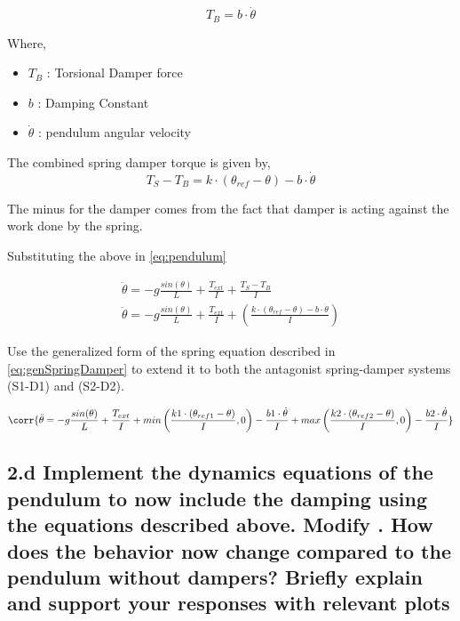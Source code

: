 \documentclass{cmc}
\begin{document}
\begin{equation}
  \label{eqn:damper}
  T_{B} = b \cdot \dot{\theta}
\end{equation}

Where,
\begin{itemize}
\item $T_{B}$ : Torsional Damper force
\item $b$ : Damping Constant
\item $\dot{\theta}$ : pendulum angular velocity
\end{itemize}

The combined spring damper torque is given by,
\begin{equation}
  \label{eq:spring_damper}
  T_{S} - T_{B} = k \cdot (\theta_{ref} - \theta) - b \cdot \dot{\theta}
\end{equation}

The minus for the damper comes from the fact that damper is acting
against the work done by the spring.

Substituting the above in \ref{eq:pendulum}

\begin{eqnarray}
  \label{eq:spring-damper}
  \ddot{\theta} = -g\frac{sin(\theta)}{L} + \frac{T_{ext}}{I} + \frac{T_{S} - T_{B}}{I} \\
  \ddot{\theta} = -g\frac{sin(\theta)}{L}+ \frac{T_{ext}}{I} + (\frac{k \cdot (\theta_{ref} - \theta) - b \cdot \dot{\theta}}{I}) \label{eq:genSpringDamper}
\end{eqnarray}

Use the generalized form of the spring equation described in
\ref{eq:genSpringDamper} to extend it to both the antagonist
spring-damper systems (S1-D1) and (S2-D2).

\begin{equation}
  \corr{\ddot{\theta} = -g\frac{sin(\theta)}{L} + \frac{T_{ext}}{I} + min \left(\frac{k1 \cdot (\theta_{ref1} - \theta)}{I}, 0 \right) - \frac{b1 \cdot \dot{\theta}}{I} + max \left(\frac{k2 \cdot (\theta_{ref2} - \theta)}{I}, 0 \right) - \frac{b2 \cdot \dot{\theta}}{I} }
\end{equation}


\subsection*{2.d Implement the dynamics equations of the pendulum to
  now include the damping using the equations described above. Modify
  .  How does the
  behavior now change compared to the pendulum without dampers? Briefly explain and support your
  responses with relevant plots}
\end{document}
